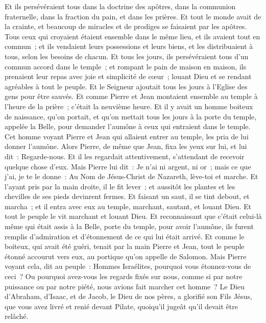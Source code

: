 \begin{multicols}{2}
Et ils persévéraient tous dans la doctrine des apôtres, dans la communion fraternelle, dans la fraction du pain, et dans les prières.
Et tout le monde avait de la crainte, et beaucoup de miracles et de prodiges se faisaient par les apôtres.
Tous ceux qui croyaient étaient ensemble dans le même lieu, et ils avaient tout en commun~;
et ils vendaient leurs possessions et leurs biens, et les distribuaient à tous, selon les besoins de chacun.
Et tous les jours, ils persévéraient tous d'un commun accord dans le temple~; et rompant le pain de maison en maison, ils prenaient leur repas avec joie et simplicité de cœur~;
louant Dieu et se rendant agréables à tout le peuple. Et le Seigneur ajoutait tous les jours à l'Eglise des gens pour être sauvés.
\VerseOne{}Et comme Pierre et Jean montaient ensemble au temple à l'heure de la prière~; c'était la neuvième heure.
Et il y avait un homme boiteux de naissance, qu'on portait, et qu'on mettait tous les jours à la porte du temple, appelée la Belle, pour demander l'aumône à ceux qui entraient dans le temple. 
Cet homme voyant Pierre et Jean qui allaient entrer au temple, les pria de lui donner l'aumône.
Alors Pierre, de même que Jean, fixa les yeux sur lui, et lui dit~: Regarde-nous.
Et il les regardait attentivement, s'attendant de recevoir quelque chose d'eux.
Mais Pierre lui dit~: Je n'ai ni argent, ni or~; mais ce que j'ai, je te le donne~: Au Nom de Jésus-Christ de Nazareth, lève-toi et marche.
Et l'ayant pris par la main droite, il le fit lever~; et aussitôt les plantes et les chevilles de ses pieds devinrent fermes.
Et faisant un saut, il se tint debout, et marcha~; et il entra avec eux au temple, marchant, sautant, et louant Dieu.
Et tout le peuple le vit marchant et louant Dieu.
Et reconnaissant que c'était celui-là même qui était assis à la Belle, porte du temple, pour avoir l'aumône, ils furent remplis d'admiration et d'étonnement de ce qui lui était arrivé.
Et comme le boiteux, qui avait été guéri, tenait par la main Pierre et Jean, tout le peuple étonné accourut vers eux, au portique qu'on appelle de Salomon.
Mais Pierre voyant cela, dit au peuple~: Hommes Israélites, pourquoi vous étonnez-vous de ceci~? Ou pourquoi avez-vous les regards fixés sur nous, comme si par notre puissance ou par notre piété, nous avions fait marcher cet homme~?
Le Dieu d'Abraham, d'Isaac, et de Jacob, le Dieu de nos pères, a glorifié son Fils Jésus, que vous avez livré et renié devant Pilate, quoiqu'il jugeât qu'il devait être relâché.

\end{multicols}
